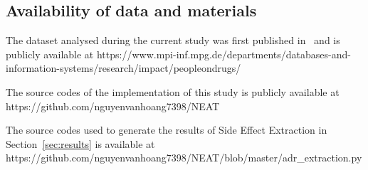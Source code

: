 \documentclass{bmcart}
\begin{document}
\begin{backmatter}
\section*{Availability of data and materials}
The dataset analysed during the current study was first published in~\cite{mukherjee2014people} and is publicly available at https://www.mpi-inf.mpg.de/departments/databases-and-information-systems/research/impact/peopleondrugs/

The source codes of the implementation of this study is publicly available at https://github.com/nguyenvanhoang7398/NEAT

The source codes used to generate the results of Side Effect Extraction in Section~\ref{sec:results} is available at https://github.com/nguyenvanhoang7398/NEAT/blob/master/adr\_extraction.py





\end{backmatter}
\end{document}
